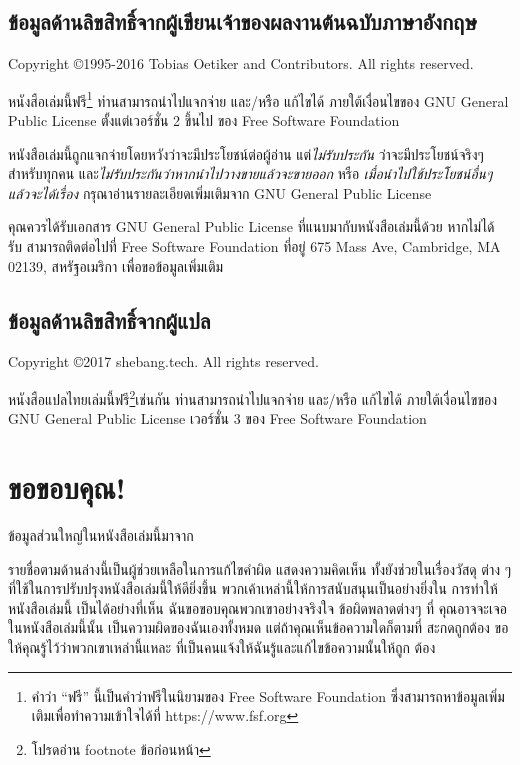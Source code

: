 \section*{ข้อมูลด้านลิขสิทธิ์จากผู้เขียนเจ้าของผลงานต้นฉบับภาษาอังกฤษ}

Copyright \copyright 1995-2016 Tobias Oetiker and
Contributors.  All rights reserved.

หนังสือเล่มนี้ฟรี\footnote{คำว่า ``ฟรี'' นี้เป็นคำว่าฟรีในนิยามของ Free Software
Foundation ซึ่งสามารถหาข้อมูลเพิ่มเติมเพื่อทำความเข้าใจได้ที่ https://www.fsf.org}
ท่านสามารถนำไปแจกจ่าย และ/หรือ แก้ไขได้ ภายใต้เงื่อนไขของ GNU General Public
License ตั้งแต่เวอร์ชั่น 2 ขึ้นไป ของ Free Software Foundation 

หนังสือเล่มนี้ถูกแจกจ่ายโดยหวังว่าจะมีประโยชน์ต่อผู้อ่าน แต่\emph{ไม่รับประกัน}
ว่าจะมีประโยชน์จริงๆสำหรับทุกคน และ\emph{ไม่รับประกันว่าหากนำไปวางขายแล้วจะขายออก}
หรือ \emph{เมื่อนำไปใช้ประโยชน์อื่นๆแล้วจะได้เรื่อง} กรุณาอ่านรายละเอียดเพิ่มเติมจาก GNU
General Public License

คุณควรได้รับเอกสาร GNU General Public License ที่แนบมากับหนังสือเล่มนี้ด้วย หากไม่ได้
รับ สามารถติดต่อไปที่ Free Software Foundation ที่อยู่ 675 Mass Ave, Cambridge,
MA 02139, สหรัฐอเมริกา เพื่อขอข้อมูลเพิ่มเติม

\section*{ข้อมูลด้านลิขสิทธิ์จากผู้แปล}

Copyright \copyright 2017 shebang.tech.  All rights reserved.

หนังสือแปลไทยเล่มนี้ฟรี\footnote{โปรดอ่าน footnote ข้อก่อนหน้า}เช่นกัน
ท่านสามารถนำไปแจกจ่าย และ/หรือ แก้ไขได้ ภายใต้เงื่อนไขของ GNU General Public
License เวอร์ชั่น 3 ของ Free Software Foundation

\chapter{ขอขอบคุณ!}

ข้อมูลส่วนใหญ่ในหนังสือเล่มนี้มาจาก

\shbtoaddmoretranslation

รายชื่อตามด้านล่างนี้เป็นผู้ช่วยเหลือในการแก้ไขคำผิด แสดงความคิดเห็น ทั้งยังช่วยในเรื่องวัสดุ%
ต่าง ๆ ที่ใช้ในการปรับปรุงหนังสือเล่มนี้ให้ดียิ่งขึ้น พวกเค้าเหล่านี้ให้การสนับสนุนเป็นอย่างยิ่งใน%
การทำให้หนังสือเล่มนี้ เป็นได้อย่างที่เห็น ฉันขอขอบคุณพวกเขาอย่างจริงใจ ข้อผิดพลาดต่างๆ ที่%
คุณอาจจะเจอในหนังสือเล่มนี้นั้น เป็นความผิดของฉันเองทั้งหมด แต่ถ้าคุณเห็นข้อความใดก็ตามที่%
สะกดถูกต้อง ขอให้คุณรู้ไว้ว่าพวกเขาเหล่านี้แหละ ที่เป็นคนแจ้งให้ฉันรู้และแก้ไขข้อความนั้นให้ถูก%
ต้อง

\shbtoaddmoretranslation
